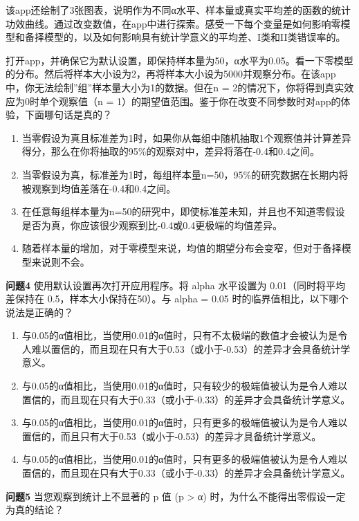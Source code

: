 \documentclass[
  letterpaper,
  DIV=11,
  numbers=noendperiod]{scrreprt}
\providecommand{\tightlist}{%
  \setlength{\itemsep}{0pt}\setlength{\parskip}{0pt}}\usepackage{longtable,booktabs,array}
\begin{document}
该app还绘制了3张图表，说明作为不同α水平、样本量或真实平均差的函数的统计功效曲线。通过改变数值，在app中进行探索。感受一下每个变量是如何影响零模型和备择模型的，以及如何影响具有统计学意义的平均差、I类和II类错误率的。

打开app，并确保它为默认设置，即保持样本量为50，α水平为0.05。看一下零模型的分布。然后将样本大小设为2，再将样本大小设为5000并观察分布。在该app中，你无法绘制''组''样本量大小为1的数据。但在n
= 2的情况下，你将得到真实效应为0时单个观察值（n =
1）的期望值范围。鉴于你在改变不同参数时对app的体验，下面哪句话是真的？

\begin{enumerate}
\def\labelenumi{\Alph{enumi})}
\tightlist
\item
  当零假设为真且标准差为1时，如果你从每组中随机抽取1个观察值并计算差异得分，那么在你将抽取的95\%的观察对中，差异将落在-0.4和0.4之间。
\item
  当零假设为真，标准差为1时，每组样本量n=50，95\%的研究数据在长期内将被观察到均值差落在-0.4和0.4之间。
\item
  在任意每组样本量为n=50的研究中，即使标准差未知，并且也不知道零假设是否为真，你应该很少观察到比-0.4或0.4更极端的均值差异。
\item
  随着样本量的增加，对于零模型来说，均值的期望分布会变窄，但对于备择模型来说则不会。
\end{enumerate}

\textbf{问题4} 使用默认设置再次打开应用程序。将 alpha 水平设置为
0.01（同时将平均差保持在 0.5，样本大小保持在50）。与 alpha = 0.05
时的临界值相比，以下哪个说法是正确的？

\begin{enumerate}
\def\labelenumi{\Alph{enumi})}
\tightlist
\item
  与0.05的α值相比，当使用0.01的α值时，只有不太极端的数值才会被认为是令人难以置信的，而且现在只有大于0.53（或小于-0.53）的差异才会具备统计学意义。
\item
  与0.05的α值相比，当使用0.01的α值时，只有较少的极端值被认为是令人难以置信的，而且现在只有大于0.33（或小于-0.33）的差异才会具备统计学意义。
\item
  与0.05的α值相比，当使用0.01的α值时，只有更多的极端值被认为是令人难以置信的，而且只有大于0.53（或小于-0.53）的差异才具备统计学意义。
\item
  与0.05的α值相比，当使用0.01的α值时，只有更多的极端值被认为是令人难以置信的，而且现在只有大于0.33（或小于-0.33）的差异才会具备统计学意义。
\end{enumerate}

\textbf{问题5} 当您观察到统计上不显著的 p 值 (p \textgreater{} α)
时，为什么不能得出零假设一定为真的结论？
\end{document}
